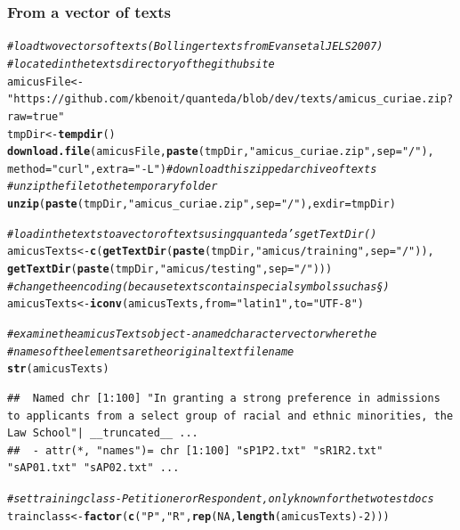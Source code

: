 \documentclass[11pt]{article}\usepackage[]{graphicx}\usepackage[]{color}
\makeatletter
\newcommand{\hlnum}[1]{\textcolor[rgb]{0.686,0.059,0.569}{#1}}%
\newcommand{\hlstr}[1]{\textcolor[rgb]{0.192,0.494,0.8}{#1}}%
\newcommand{\hlcom}[1]{\textcolor[rgb]{0.678,0.584,0.686}{\textit{#1}}}%
\newcommand{\hlopt}[1]{\textcolor[rgb]{0,0,0}{#1}}%
\newcommand{\hlstd}[1]{\textcolor[rgb]{0.345,0.345,0.345}{#1}}%
\newcommand{\hlkwb}[1]{\textcolor[rgb]{0.69,0.353,0.396}{#1}}%
\newcommand{\hlkwc}[1]{\textcolor[rgb]{0.333,0.667,0.333}{#1}}%
\newcommand{\hlkwd}[1]{\textcolor[rgb]{0.737,0.353,0.396}{\textbf{#1}}}%
\newenvironment{kframe}{%
 \def\at@end@of@kframe{}%
 \ifinner\ifhmode%
  \def\at@end@of@kframe{\end{minipage}}%
  \begin{minipage}{\columnwidth}%
 \fi\fi%
 \def\FrameCommand##1{\hskip\@totalleftmargin \hskip-\fboxsep
 \colorbox{shadecolor}{##1}\hskip-\fboxsep
     \hskip-\linewidth \hskip-\@totalleftmargin \hskip\columnwidth}%
 \MakeFramed {\advance\hsize-\width
   \@totalleftmargin\z@ \linewidth\hsize
   \@setminipage}}%
 {\par\unskip\endMakeFramed%
 \at@end@of@kframe}
\newenvironment{knitrout}{}{} %
\makeatother
\begin{document}
\subsubsection{From a vector of texts}

\begin{knitrout}\footnotesize
{}\color{fgcolor}\begin{kframe}
\begin{alltt}
\hlcom{# load two vectors of texts (Bollinger texts from Evans et al JELS 2007)}
\hlcom{# located in the texts directory of the github site}
\hlstd{amicusFile} \hlkwb{<-} \hlstr{"https://github.com/kbenoit/quanteda/blob/dev/texts/amicus_curiae.zip?raw=true"}
\hlstd{tmpDir} \hlkwb{<-} \hlkwd{tempdir}\hlstd{()}
\hlkwd{download.file}\hlstd{(amicusFile,} \hlkwd{paste}\hlstd{(tmpDir,} \hlstr{"amicus_curiae.zip"}\hlstd{,} \hlkwc{sep}\hlstd{=}\hlstr{"/"}\hlstd{),}
              \hlkwc{method}\hlstd{=}\hlstr{"curl"}\hlstd{,} \hlkwc{extra}\hlstd{=}\hlstr{"-L"}\hlstd{)} \hlcom{# download this zipped archive of texts}
\hlcom{# unzip the file to the temporary folder}
\hlkwd{unzip}\hlstd{(}\hlkwd{paste}\hlstd{(tmpDir,} \hlstr{"amicus_curiae.zip"}\hlstd{,} \hlkwc{sep}\hlstd{=}\hlstr{"/"}\hlstd{),} \hlkwc{exdir}\hlstd{=tmpDir)}

\hlcom{# load in the texts to a vector of texts using quanteda's getTextDir()}
\hlstd{amicusTexts} \hlkwb{<-} \hlkwd{c}\hlstd{(}\hlkwd{getTextDir}\hlstd{(}\hlkwd{paste}\hlstd{(tmpDir,} \hlstr{"amicus/training"}\hlstd{,} \hlkwc{sep}\hlstd{=}\hlstr{"/"}\hlstd{)),}
                 \hlkwd{getTextDir}\hlstd{(}\hlkwd{paste}\hlstd{(tmpDir,} \hlstr{"amicus/testing"}\hlstd{,} \hlkwc{sep}\hlstd{=}\hlstr{"/"}\hlstd{)))}
\hlcom{# change the encoding (because texts contain special symbols such as §)}
\hlstd{amicusTexts} \hlkwb{<-} \hlkwd{iconv}\hlstd{(amicusTexts,} \hlkwc{from}\hlstd{=}\hlstr{"latin1"}\hlstd{,} \hlkwc{to}\hlstd{=}\hlstr{"UTF-8"}\hlstd{)}

\hlcom{# examine the amicusTexts object - a named character vector where the}
\hlcom{# names of the elements are the original text filename}
\hlkwd{str}\hlstd{(amicusTexts)}
\end{alltt}
\begin{verbatim}
##  Named chr [1:100] "In granting a strong preference in admissions to applicants from a select group of racial and ethnic minorities, the Law School"| __truncated__ ...
##  - attr(*, "names")= chr [1:100] "sP1P2.txt" "sR1R2.txt" "sAP01.txt" "sAP02.txt" ...
\end{verbatim}
\begin{alltt}
\hlcom{# set training class - Petitioner or Respondent, only known for the two test docs}
\hlstd{trainclass} \hlkwb{<-} \hlkwd{factor}\hlstd{(}\hlkwd{c}\hlstd{(}\hlstr{"P"}\hlstd{,} \hlstr{"R"}\hlstd{,} \hlkwd{rep}\hlstd{(}\hlnum{NA}\hlstd{,} \hlkwd{length}\hlstd{(amicusTexts)}\hlopt{-}\hlnum{2}\hlstd{)))}


\end{alltt}
\end{kframe}
\end{knitrout}
\end{document}
